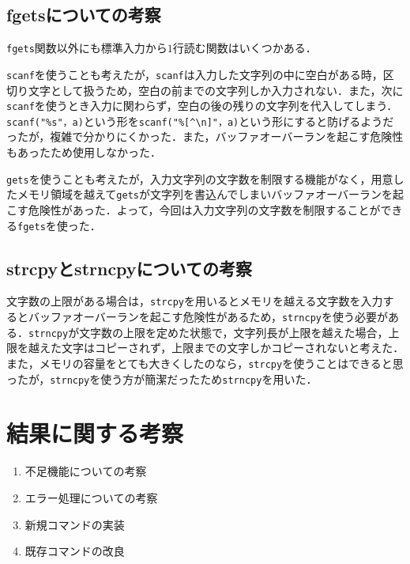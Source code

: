 \documentclass[a4j,11pt]{jarticle}
\begin{document}
\subsection{fgetsについての考察}
\verb|fgets|関数以外にも標準入力から$1$行読む関数はいくつかある．

\verb|scanf|を使うことも考えたが，\verb|scanf|は入力した文字列の中に空白がある時，区切り文字として扱うため，空白の前までの文字列しか入力されない．また，次に\verb|scanf|を使うとき入力に関わらず，空白の後の残りの文字列を代入してしまう．\verb|scanf("%s"，a)|という形を\verb|scanf("%[^\n]"，a)|という形にすると防げるようだったが，複雑で分かりにくかった．また，バッファオーバーランを起こす危険性もあったため使用しなかった．

\verb|gets|を使うことも考えたが，入力文字列の文字数を制限する機能がなく，用意したメモリ領域を越えて\verb|gets|が文字列を書込んでしまいバッファオーバーランを起こす危険性があった．よって，今回は入力文字列の文字数を制限することができる\verb|fgets|を使った．

\subsection{strcpyとstrncpyについての考察}
文字数の上限がある場合は，\verb|strcpy|を用いるとメモリを越える文字数を入力するとバッファオーバーランを起こす危険性があるため，\verb|strncpy|を使う必要がある．\verb|strncpy|が文字数の上限を定めた状態で，文字列長が上限を越えた場合，上限を越えた文字はコピーされず，上限までの文字しかコピーされないと考えた．また，メモリの容量をとても大きくしたのなら，\verb|strcpy|を使うことはできると思ったが，\verb|strncpy|を使う方が簡潔だったため\verb|strncpy|を用いた．


\section{結果に関する考察}
\begin{enumerate}
\setlength{\parskip}{2pt} \setlength{\itemsep}{2pt}
    \item 不足機能についての考察
    \item エラー処理についての考察
    \item 新規コマンドの実装
    \item 既存コマンドの改良
\end{enumerate}
\end{document}
